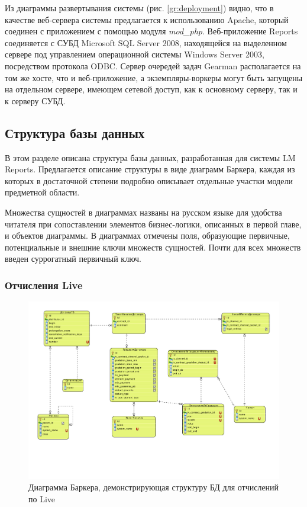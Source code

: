 Из диаграммы развертывания системы (рис. \ref{gr:deployment}) видно, что в качестве веб-сервера
системы предлагается к использованию Apache, который соединен с приложением с помощью модуля \textit{mod\_php}.
Веб-приложение Reports соединяется с СУБД Microsoft SQL Server 2008, находящейся на выделенном
сервере под управлением операционной системы Windows Server 2003, посредством протокола ODBC.
Сервер очередей задач Gearman располагается на том же хосте, что и веб-приложение, а экземпляры-воркеры
могут быть запущены на отдельном сервере, имеющем сетевой доступ, как к основному серверу,
так и к серверу СУБД.

\subsection{Структура базы данных}
В этом разделе описана структура базы данных, разработанная для системы LM Reports.
Предлагается описание структуры в виде диаграмм Баркера, каждая из которых в достаточной степени
подробно описывает отдельные участки модели предметной области. 

Множества сущностей в диаграммах названы на русском языке для удобства читателя при сопоставлении
элементов бизнес-логики, описанных в первой главе, и объектов диаграммы.
В диаграммах отмечены поля, образующие первичные, потенциальные и внешние ключи множеств сущностей. 
Почти для всех множеств введен суррогатный первичный ключ.

\newpage
\subsubsection{Отчисления Live}

\begin{figure}[!ht]
\begin{center}
\vspace{-0.5cm}
\includegraphics[scale=0.65, trim=10mm 40mm 0mm 10mm, clip]{../resources/uml/TV_DEDUCT.pdf}
\caption{Диаграмма Баркера, демонстрирующая структуру БД для отчислений по Live}
\label{gr:tv_deduct}
\end{center} 
\end{figure}


